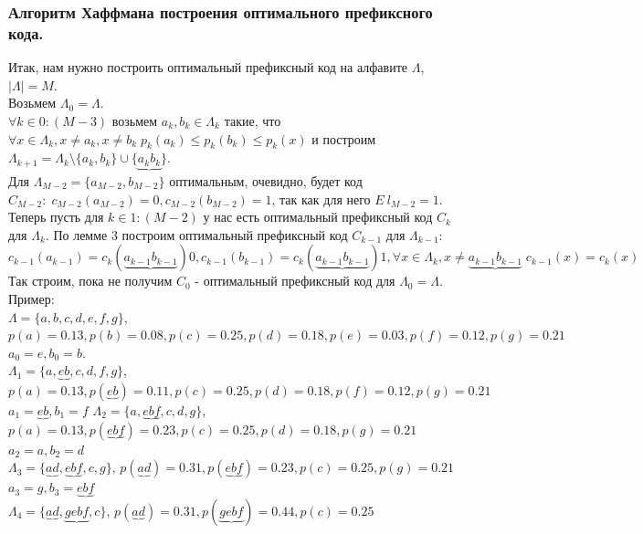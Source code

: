 \subsubsection{Алгоритм Хаффмана построения оптимального префиксного кода.}
Итак, нам нужно построить оптимальный префиксный код на алфавите $\Lambda$, $|\Lambda| = M$.\\
Возьмем $\Lambda_0 = \Lambda$.\\
$\forall k \in 0:(M - 3)$ возьмем $a_k, b_k \in \Lambda_k$ такие, что $\forall x \in \Lambda_k, x \not= a_k, x \not= b_k \; p_k(a_k) \leq p_k(b_k) \leq p_k(x)$ и построим $\Lambda_{k + 1} = \Lambda_{k} \setminus \{a_k, b_k\} \cup \{\underbrace{a_kb_k}\}$.\\
Для $\Lambda_{M - 2} = \{a_{M - 2}, b_{M - 2}\}$ оптимальным, очевидно, будет код $C_{M - 2}: \; c_{M - 2}(a_{M - 2}) = 0, c_{M - 2}(b_{M - 2}) = 1$, так как для него $E \: l_{M - 2} = 1$.\\
Теперь пусть для $k \in 1:(M - 2)$ у нас есть оптимальный префиксный код $C_k$ для $\Lambda_k$. По лемме 3 построим оптимальный префиксный код $C_{k - 1}$ для $\Lambda_{k - 1}$: $c_{k - 1}(a_{k - 1}) = c_k(\underbrace{a_{k - 1}b_{k - 1}})0, c_{k - 1}(b_{k - 1}) = c_k(\underbrace{a_{k - 1}b_{k - 1}})1, \forall x \in \Lambda_k, x \not= \underbrace{a_{k - 1}b_{k - 1}} \; c_{k - 1}(x) = c_k(x)$\\
Так строим, пока не получим $C_0$ - оптимальный префиксный код для $\Lambda_0 = \Lambda$.\\
Пример:\\
$\Lambda = \{a, b, c, d, e, f, g\}$, $p(a) = 0.13, p(b) = 0.08, p(c) = 0.25, p(d) = 0.18, p(e) = 0.03, p(f) = 0.12, p(g) = 0.21$\\
$a_0 = e, b_0 = b$.\\
$\Lambda_1 = \{a, \underbrace{eb}, c, d, f, g\}$, $p(a) = 0.13, p(\underbrace{eb}) = 0.11, p(c) = 0.25, p(d) = 0.18, p(f) = 0.12, p(g) = 0.21$\\
$a_1 = \underbrace{eb}, b_1 = f$
$\Lambda_2 = \{a, \underbrace{ebf}, c, d, g\}$, $p(a) = 0.13, p(\underbrace{ebf}) = 0.23, p(c) = 0.25, p(d) = 0.18, p(g) = 0.21$\\
$a_2 = a, b_2 = d$\\
$\Lambda_3 = \{\underbrace{ad}, \underbrace{ebf}, c, g\}$, $p(\underbrace{ad}) = 0.31, p(\underbrace{ebf}) = 0.23, p(c) = 0.25, p(g) = 0.21$\\
$a_3 = g, b_3 = \underbrace{ebf}$\\
$\Lambda_4 = \{\underbrace{ad}, \underbrace{gebf}, c\}$, $p(\underbrace{ad}) = 0.31, p(\underbrace{gebf}) = 0.44, p(c) = 0.25$\\
